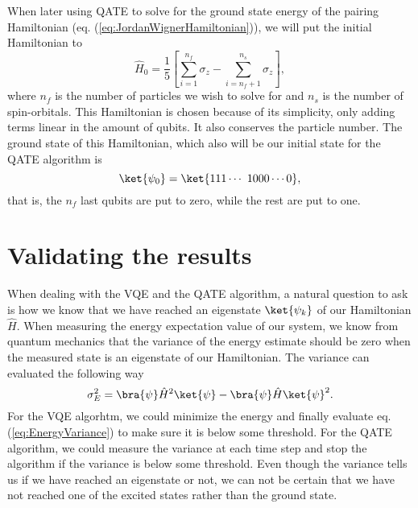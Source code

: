 When later using QATE to solve for the ground state energy of the pairing Hamiltonian (eq. (\ref{eq:JordanWignerHamiltonian})), we will put the initial Hamiltonian to
\begin{equation}
    \label{eq:QATEInitialHamiltonian}
    \hat{H}_0 = \frac{1}{5}[\sum_{i=1}^{n_f} \sigma_z - \sum_{i=n_f+1}^{n_s}\sigma_z],
\end{equation}
where $n_f$ is the number of particles we wish to solve for and $n_s$ is the number of spin-orbitals. This Hamiltonian is chosen because of its simplicity, only adding terms linear in the amount of qubits. It also conserves the particle number. The ground state of this Hamiltonian, which also will be our initial state for the QATE algorithm is
\begin{equation}
    \label{eq:QATEInitialState}
    \ket{\psi_0} = \ket{111\cdots\ 1 000\cdots 0},
\end{equation}
that is, the $n_f$ last qubits are put to zero, while the rest are put to one.

\section{Validating the results}
When dealing with the VQE and the QATE algorithm, a natural question to ask is how we know that we have reached an eigenstate $\ket{\psi_k}$ of our Hamiltonian $\hat{H}$. When measuring the energy expectation value of our system, we know from quantum mechanics that the variance of the energy estimate should be zero when the measured state is an eigenstate of our Hamiltonian. The variance can evaluated the following way
\begin{equation}
    \label{eq:EnergyVariance}
    \sigma^2_E = \bra{\psi}\hat{H}^2\ket{\psi} - \bra{\psi} \hat{H} \ket{\psi}^2.
\end{equation}
For the VQE algorhtm, we could minimize the energy and finally evaluate eq. (\ref{eq:EnergyVariance}) to make sure it is below some threshold. For the QATE algorithm, we could measure the variance at each time step and stop the algorithm if the variance is below some threshold. Even though the variance tells us if we have reached an eigenstate or not, we can not be certain that we have not reached one of the excited states rather than the ground state.

